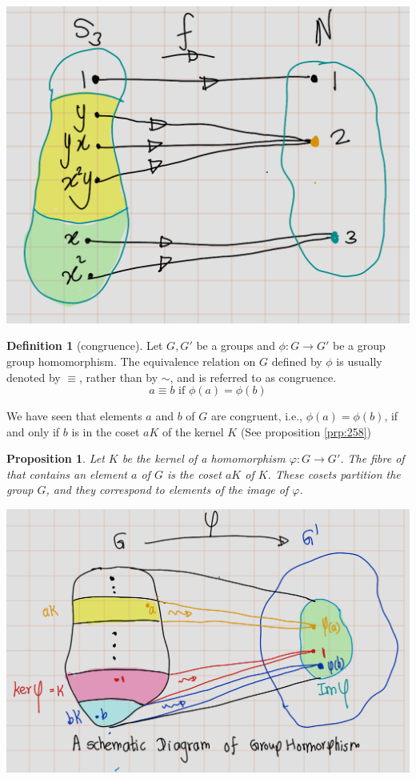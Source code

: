 \documentclass[
]{book}
\newtheorem{proposition}{Proposition}[chapter]
\theoremstyle{definition}
\newtheorem{definition}{Definition}[chapter]
\theoremstyle{definition}
\theoremstyle{definition}
\theoremstyle{definition}
\theoremstyle{remark}
\begin{document}
\includegraphics{figures/ch_2/fig34.png}

\begin{definition}[congruence]
\protect\hypertarget{def:unnamed-chunk-41}{}\label{def:unnamed-chunk-41}Let \(G,G'\) be a groups and \(\phi: G \rightarrow G'\) be a group group homomorphism. The equivalence relation on \(G\) defined by \(\phi\) is usually denoted by \(\equiv\), rather than by \(\sim\), and is referred to as congruence.
\[a \equiv b \text{ if }\phi(a) = \phi(b)\]
\end{definition}

We have seen that elements \(a\) and \(b\) of \(G\) are congruent, i.e., \(\phi(a) = \phi(b)\), if and only if \(b\) is
in the coset \(a K\) of the kernel \(K\) (See proposition \ref{prp:258})

\begin{proposition}
\protect\hypertarget{prp:unnamed-chunk-42}{}\label{prp:unnamed-chunk-42}Let \(K\) be the kernel of a homomorphism \(\varphi: G \to G'\). The fibre of that contains an element \(a\) of \(G\) is the coset \(a K\) of \(K\). These cosets partition the group \(G\), and they correspond to elements of the image of \(\varphi\).
\end{proposition}

\includegraphics{figures/ch_2/fig35.png}
\end{document}
